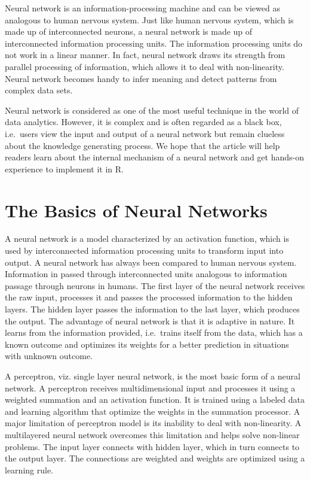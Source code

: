 \documentclass[]{book}
\begin{document}
Neural network is an information-processing machine and can be viewed as analogous to human nervous system. Just like human nervous system, which is made up of interconnected neurons, a neural network is made up of interconnected information processing units. The information processing units do not work in a linear manner. In fact, neural network draws its strength from parallel processing of information, which allows it to deal with non-linearity. Neural network becomes handy to infer meaning and detect patterns from complex data sets.

Neural network is considered as one of the most useful technique in the world of data analytics. However, it is complex and is often regarded as a black box, i.e.~users view the input and output of a neural network but remain clueless about the knowledge generating process. We hope that the article will help readers learn about the internal mechanism of a neural network and get hands-on experience to implement it in R.

\hypertarget{the-basics-of-neural-networks}{%
\section{The Basics of Neural Networks}\label{the-basics-of-neural-networks}}

A neural network is a model characterized by an activation function, which is used by interconnected information processing units to transform input into output. A neural network has always been compared to human nervous system. Information in passed through interconnected units analogous to information passage through neurons in humans. The first layer of the neural network receives the raw input, processes it and passes the processed information to the hidden layers. The hidden layer passes the information to the last layer, which produces the output. The advantage of neural network is that it is adaptive in nature. It learns from the information provided, i.e.~trains itself from the data, which has a known outcome and optimizes its weights for a better prediction in situations with unknown outcome.

A perceptron, viz. single layer neural network, is the most basic form of a neural network. A perceptron receives multidimensional input and processes it using a weighted summation and an activation function. It is trained using a labeled data and learning algorithm that optimize the weights in the summation processor. A major limitation of perceptron model is its inability to deal with non-linearity. A multilayered neural network overcomes this limitation and helps solve non-linear problems. The input layer connects with hidden layer, which in turn connects to the output layer. The connections are weighted and weights are optimized using a learning rule.
\end{document}
